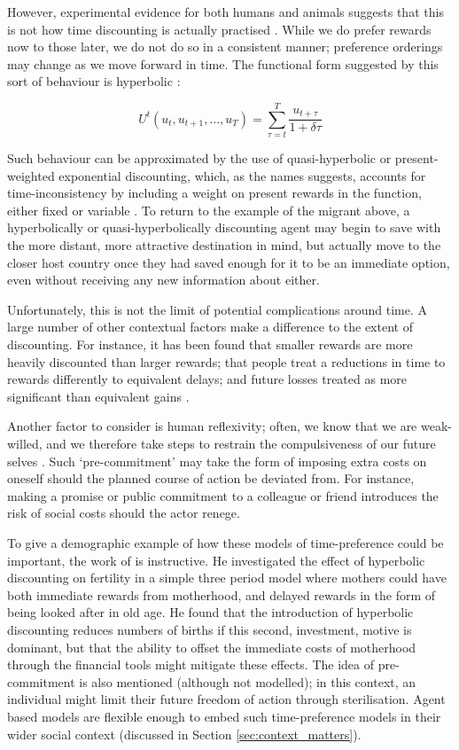 \documentclass{article}
\begin{document}
However, experimental evidence for both humans and animals suggests that this is not how time discounting is actually practised \citep{Boyer2008}. While we do prefer rewards now to those later, we do not do so in a consistent manner; preference orderings may change as we move forward in time. The functional form suggested by this sort of behaviour is hyperbolic \citep{Benhabib2010}:

\[
U^{t}(u_t, u_{t+1},\dots,u_T ) = \sum_{\tau=t}^{T} \frac{ u_{t+\tau}}{1+\delta\tau}
\]


Such behaviour can be approximated by the use of quasi-hyperbolic or present-weighted exponential discounting, which, as the names suggests, accounts for time-inconsistency by including a weight on present rewards in the function, either fixed or variable \citep{Benhabib2010}. To return to the example of the migrant above, a hyperbolically or quasi-hyperbolically discounting agent may begin to save with the more distant, more attractive destination in mind, but actually move to the closer host country once they had saved enough for it to be an immediate option, even without receiving any new information about either.

Unfortunately, this is not the limit of potential complications around time. A large number of other contextual factors make a difference to the extent of discounting. For instance, it has been found that smaller rewards are more heavily discounted than larger rewards; that people treat a reductions in time to rewards differently to equivalent delays; and future losses treated as more significant than equivalent gains \citep{Read2000}.

Another factor to consider is human reflexivity; often, we know that we are weak-willed, and we therefore take steps to restrain the compulsiveness of our future selves \citep{ODonoghue2000}. Such `pre-commitment' may take the form of imposing extra costs on oneself should the planned course of action be deviated from. For instance, making a promise or public commitment to a colleague or friend introduces the risk of social costs should the actor renege. 

To give a demographic example of how these models of time-preference could be important, the work of  \cite{Wrede2011} is instructive. He investigated the effect of hyperbolic discounting on fertility in a simple three period model where mothers could have both immediate rewards from motherhood, and delayed rewards in the form of being looked after in old age. He found that the introduction of hyperbolic discounting reduces numbers of births if this second, investment, motive is dominant, but that the ability to offset the immediate costs of motherhood through the financial tools might mitigate these effects. The idea of pre-commitment is also mentioned (although not modelled); in this context, an individual might limit their future freedom of action through sterilisation. Agent based models are flexible enough to embed such time-preference models in their wider social context (discussed in Section \ref{sec:context_matters}).
\end{document}
